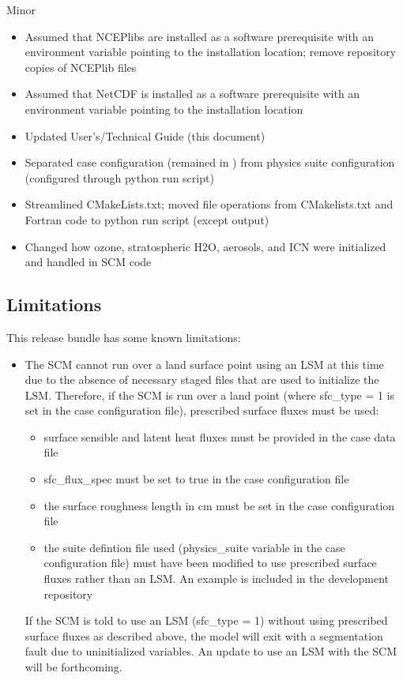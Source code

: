 Minor
\begin{itemize}
\item Assumed that NCEPlibs are installed as a software prerequisite with an environment variable pointing to the installation location; remove repository copies of NCEPlib files
\item Assumed that NetCDF is installed as a software prerequisite with an environment variable pointing to the installation location
\item Updated User's/Technical Guide (this document)
\item Separated case configuration (remained in ) from physics suite configuration (configured through python run script)
\item Streamlined CMakeLists.txt; moved file operations from CMakelists.txt and Fortran code to python run script (except output)
\item Changed how ozone, stratospheric H2O, aerosols, and ICN were initialized and handled in SCM code
\end{itemize}

\subsection{Limitations}

This release bundle has some known limitations:

\begin{itemize}
\item The SCM cannot run over a land surface point using an LSM at this time due to the absence of necessary staged files that are used to initialize the LSM. Therefore, if the SCM is run over a land point (where sfc\_type = 1 is set in the case configuration file), prescribed surface fluxes must be used:
\begin{itemize}
\item surface sensible and latent heat fluxes must be provided in the case data file
\item sfc\_flux\_spec must be set to true in the case configuration file
\item the surface roughness length in cm must be set in the case configuration file
\item the suite defintion file used (physics\_suite variable in the case configuration file) must have been modified to use prescribed surface fluxes rather than an LSM. An example is included in the development repository
\end{itemize}
If the SCM is told to use an LSM (sfc\_type = 1) without using prescribed surface fluxes as described above, the model will exit with a segmentation fault due to uninitialized variables. An update to use an LSM with the SCM will be forthcoming.
\end{itemize}
